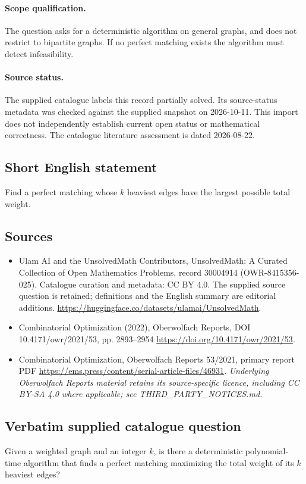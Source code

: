 \documentclass[11pt]{article}
\begin{document}
\paragraph{Scope qualification.}
The question asks for a deterministic algorithm on general graphs, and does not restrict to bipartite graphs. If no perfect matching exists the algorithm must detect infeasibility.
\paragraph{Source status.}
The supplied catalogue labels this record partially solved. Its source-status metadata was checked against the supplied snapshot on 2026-10-11. This import does not independently establish current open status or mathematical correctness. The catalogue literature assessment is dated 2026-08-22.
\subsection{Short English statement}
Find a perfect matching whose $k$ heaviest edges have the largest possible total weight.
\subsection{Sources}
\begin{itemize}
\item[S1] Ulam AI and the UnsolvedMath Contributors, UnsolvedMath: A Curated Collection of Open Mathematics Problems, record 30004914 (OWR-8415356-025). Catalogue curation and metadata: CC BY 4.0. The supplied source question is retained; definitions and the English summary are editorial additions.
\url{https://huggingface.co/datasets/ulamai/UnsolvedMath}.
\item[S2] Combinatorial Optimization (2022), Oberwolfach Reports, DOI 10.4171/owr/2021/53, pp. 2893--2954
\url{https://doi.org/10.4171/owr/2021/53}.
\item[S3] Combinatorial Optimization, Oberwolfach Reports 53/2021, primary report PDF
\url{https://ems.press/content/serial-article-files/46931}.
\textit{Underlying Oberwolfach Reports material retains its source-specific licence, including CC BY-SA 4.0 where applicable; see THIRD\_PARTY\_NOTICES.md.}
\end{itemize}
\subsection{Verbatim supplied catalogue question}
Given a weighted graph and an integer $k$, is there a deterministic polynomial-time algorithm that finds a perfect matching maximizing the total weight of its $k$ heaviest edges?
\end{document}
